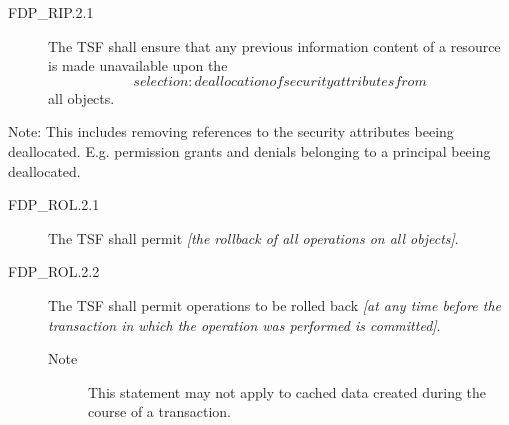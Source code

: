 \documentclass[12pt,english]{scrbook}
\begin{document}



\begin{description}
\item[FDP{\_}RIP.2.1]

The TSF shall ensure that any previous information content of a
resource is made unavailable upon the \emph{\[selection: deallocation of
security attributes from\]} all objects.
\end{description}

Note: This includes removing references to the security attributes beeing
deallocated. E.g. permission grants and denials belonging to a principal beeing
deallocated.




\begin{description}
\item[FDP{\_}ROL.2.1 ]

The TSF shall permit \emph{{[}the rollback of all
operations on all objects]}.

\item[FDP{\_}ROL.2.2 ]

The TSF shall permit operations to be rolled
back \emph{{[}at any time before the transaction in which the operation was
performed is committed]}.
\begin{description}
\item[Note ]

This statement may not apply to cached data created
during the course of a transaction.

\end{description}

\end{description}


\end{document}
